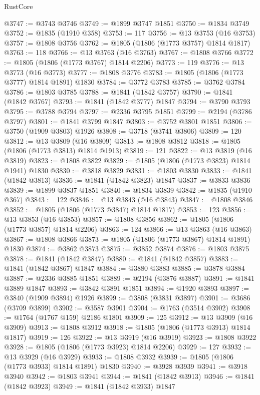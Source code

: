 \begin{lexlean}{RustCore}
\begin{coremodule}
@3747 := @3743 @3746
@3749 := @1899 @3747 @1851
@3750 := @1834 @3749
@3752 := @1835 (@1910 @358)
@3753 := 117
@3756 := @13 @3753 (@16 @3753)
@3757 := @1808 @3756
@3762 := @1805 (@1806 (@1773 @3757) @1814 @1817)
@3763 := 118
@3766 := @13 @3763 (@16 @3763)
@3767 := @1808 @3766
@3772 := @1805 (@1806 (@1773 @3767) @1814 @2206)
@3773 := 119
@3776 := @13 @3773 (@16 @3773)
@3777 := @1808 @3776
@3783 := @1805 (@1806 (@1773 @3777) @1814 @1891) @1830
@3784 := @3772 @3783
@3785 := @3762 @3784
@3786 := @1803 @3785
@3788 := @1841 (@1842 @3757)
@3790 := @1841 (@1842 @3767)
@3793 := @1841 (@1842 @3777) @1847
@3794 := @3790 @3793
@3795 := @3788 @3794
@3797 := @2336 @3795 @1851
@3799 := @2194 (@3786 @3797)
@3801 := @1841 @3799 @1847
@3803 := @3752 @3801 @1851
@3806 := @3750 (@1909 @3803) @1926
@3808 := @3718 (@3741 @3806)
@3809 := 120
@3812 := @13 @3809 (@16 @3809)
@3813 := @1808 @3812
@3818 := @1805 (@1806 (@1773 @3813) @1814 @1913)
@3819 := 121
@3822 := @13 @3819 (@16 @3819)
@3823 := @1808 @3822
@3829 := @1805 (@1806 (@1773 @3823) @1814 @1941) @1830
@3830 := @3818 @3829
@3831 := @1803 @3830
@3833 := @1841 (@1842 @3813)
@3836 := @1841 (@1842 @3823) @1847
@3837 := @3833 @3836
@3839 := @1899 @3837 @1851
@3840 := @1834 @3839
@3842 := @1835 (@1910 @367)
@3843 := 122
@3846 := @13 @3843 (@16 @3843)
@3847 := @1808 @3846
@3852 := @1805 (@1806 (@1773 @3847) @1814 @1817)
@3853 := 123
@3856 := @13 @3853 (@16 @3853)
@3857 := @1808 @3856
@3862 := @1805 (@1806 (@1773 @3857) @1814 @2206)
@3863 := 124
@3866 := @13 @3863 (@16 @3863)
@3867 := @1808 @3866
@3873 := @1805 (@1806 (@1773 @3867) @1814 @1891) @1830
@3874 := @3862 @3873
@3875 := @3852 @3874
@3876 := @1803 @3875
@3878 := @1841 (@1842 @3847)
@3880 := @1841 (@1842 @3857)
@3883 := @1841 (@1842 @3867) @1847
@3884 := @3880 @3883
@3885 := @3878 @3884
@3887 := @2336 @3885 @1851
@3889 := @2194 (@3876 @3887)
@3891 := @1841 @3889 @1847
@3893 := @3842 @3891 @1851
@3894 := @1920 @3893
@3897 := @3840 (@1909 @3894) @1926
@3899 := @3808 (@3831 @3897)
@3901 := @3686 (@3709 @3899)
@3902 := @3587 @3901
@3904 := @1763 (@3514 @3902)
@3908 := @1764 (@1767 @159) @2186 @1801
@3909 := 125
@3912 := @13 @3909 (@16 @3909)
@3913 := @1808 @3912
@3918 := @1805 (@1806 (@1773 @3913) @1814 @1817)
@3919 := 126
@3922 := @13 @3919 (@16 @3919)
@3923 := @1808 @3922
@3928 := @1805 (@1806 (@1773 @3923) @1814 @2206)
@3929 := 127
@3932 := @13 @3929 (@16 @3929)
@3933 := @1808 @3932
@3939 := @1805 (@1806 (@1773 @3933) @1814 @1891) @1830
@3940 := @3928 @3939
@3941 := @3918 @3940
@3942 := @1803 @3941
@3944 := @1841 (@1842 @3913)
@3946 := @1841 (@1842 @3923)
@3949 := @1841 (@1842 @3933) @1847

\end{coremodule}
\end{lexlean}
